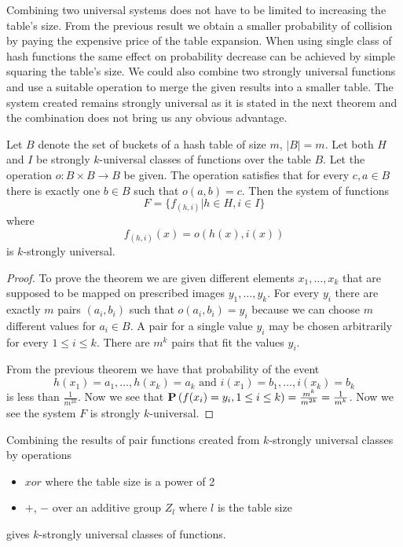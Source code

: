 Combining two universal systems does not have to be limited to increasing the table's size. From the previous result we obtain a smaller probability of collision by paying the expensive price of the table expansion. When using single class of hash functions the same effect on probability decrease can be achieved by simple squaring the table's size. We could also combine two strongly universal functions and use a suitable operation to merge the given results into a smaller table. The system created remains strongly universal as it is stated in the next theorem and the combination does not bring us any obvious advantage.

\begin{theorem}
Let $B$ denote the set of buckets of a hash table of size $m$, $|B| = m$. Let both $H$ and $I$ be strongly $k$-universal classes of functions over the table $B$. Let the operation $o: B \times B \rightarrow B$ be given. The operation satisfies that for every $c, a \in B$ there is exactly one $b \in B$ such that $o(a, b) = c$. Then the system of functions \[F = \lbrace f_{(h, i)} | h \in H, i \in I \rbrace\] where \[f_{(h, i)}(x) = o(h(x), i(x))\] is $k$-strongly universal.
\end{theorem}
\begin{proof}
To prove the theorem we are given different elements $x_1, \dots, x_k$ that are supposed to be mapped on prescribed images $y_1, \dots, y_k$. For every $y_i$ there are exactly $m$ pairs $(a_i, b_i)$ such that $o(a_i, b_i) = y_i$ because we can choose $m$ different values for $a_i \in B$. A pair for a single value $y_i$ may be chosen arbitrarily for every $1 \le i \le k$. There are $m^k$ pairs that fit the values $y_i$.

From the previous theorem we have that probability of the event \[ h(x_1) = a_1, \dots, h(x_k) = a_k \text{ and } i(x_1) = b_1, \dots, i(x_k) = b_k \] is less than $\frac{1}{m^{2k}}$. Now we see that $\mathbf{P}\left(f(x_i\right) = y_i, 1 \le i \le k) = \frac{m^k}{m^{2k}} = \frac{1}{m^k}$. Now we see the system $F$ is strongly $k$-universal.
\end{proof}

\begin{corollary}
Combining the results of pair functions created from $k$-strongly universal classes by operations
\begin{itemize}
\item $xor$ where the table size is a power of 2
\item $+$, $-$ over an additive group $Z_l$ where $l$ is the table size
\end{itemize}
gives $k$-strongly universal classes of functions.
\end{corollary}

